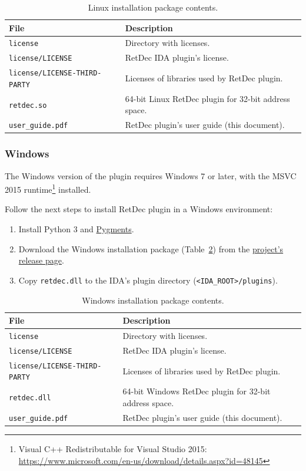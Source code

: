 \documentclass[pdftex, a4paper,12pt, oneside, svgnames]{article}
\begin{document}
\begin{table}[!ht]
\centering
\caption{Linux installation package contents.}
\label{table:installation-package-linux}
\begin{tabular}{ll}
\textbf{File} & \textbf{Description}\\
\hline
\texttt{license} & Directory with licenses. \\
\texttt{license/LICENSE} & RetDec IDA plugin's license. \\
\texttt{license/LICENSE-THIRD-PARTY} & Licenses of libraries used by RetDec plugin. \\
\texttt{retdec.so} & 64-bit Linux RetDec plugin for 32-bit address space. \\
\texttt{user_guide.pdf} & RetDec plugin's user guide (this document). \\
\end{tabular}
\end{table}

\subsubsection{Windows}
\label{sec:installation:windows}
The Windows version of the plugin requires Windows 7 or later, with the MSVC 2015 runtime\footnote{Visual C++ Redistributable for Visual Studio 2015: \url{https://www.microsoft.com/en-us/download/details.aspx?id=48145}} installed.

Follow the next steps to install RetDec plugin in a Windows environment:
\begin{enumerate}
	\item Install Python 3 and \href{http://pygments.org/}{Pygments}.
	\item Download the Windows installation package (Table~\ref{table:installation-package-windows}) from the \href{https://github.com/avast-tl/retdec-idaplugin/releases}{project's release page}.
	\item Copy \texttt{retdec.dll} to the IDA's plugin directory (\texttt{<IDA\_ROOT>/plugins}).
\end{enumerate}

\begin{table}[!ht]
\centering
\caption{Windows installation package contents.}
\label{table:installation-package-windows}
\begin{tabular}{ll}
\textbf{File} & \textbf{Description}\\
\hline
\texttt{license} & Directory with licenses. \\
\texttt{license/LICENSE} & RetDec IDA plugin's license. \\
\texttt{license/LICENSE-THIRD-PARTY} & Licenses of libraries used by RetDec plugin. \\
\texttt{retdec.dll} & 64-bit Windows RetDec plugin for 32-bit address space. \\
\texttt{user_guide.pdf} & RetDec plugin's user guide (this document). \\
\end{tabular}
\end{table}
\end{document}
